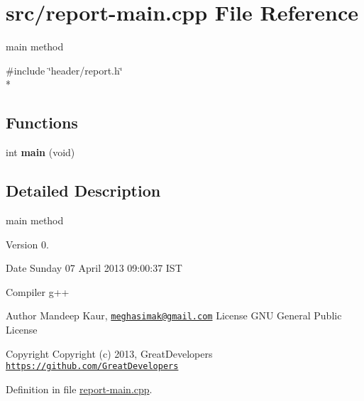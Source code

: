 \hypertarget{report-main_8cpp}{\section{src/report-\/main.cpp File Reference}
\label{report-main_8cpp}
}


main method  


{\ttfamily \#include \char`\"{}header/report.\-h\char`\"{}}\\*
\subsection*{Functions}
\begin{DoxyCompactItemize}
\item 
\hypertarget{report-main_8cpp_a840291bc02cba5474a4cb46a9b9566fe}{int {\bfseries main} (void)}\label{report-main_8cpp_a840291bc02cba5474a4cb46a9b9566fe}

\end{DoxyCompactItemize}


\subsection{Detailed Description}
main method \begin{DoxyVersion}{Version}
0. 
\end{DoxyVersion}
\begin{DoxyDate}{Date}
Sunday 07 April 2013 09\-:00\-:37 I\-S\-T\par
 Compiler g++
\end{DoxyDate}
\begin{DoxyAuthor}{Author}
Mandeep Kaur, \href{mailto:meghasimak@gmail.com}{\tt meghasimak@gmail.\-com} License G\-N\-U General Public License 
\end{DoxyAuthor}
\begin{DoxyCopyright}{Copyright}
Copyright (c) 2013, Great\-Developers \href{https://github.com/GreatDevelopers}{\tt https\-://github.\-com/\-Great\-Developers} 
\end{DoxyCopyright}


Definition in file \hyperlink{report-main_8cpp_source}{report-\/main.\-cpp}.

